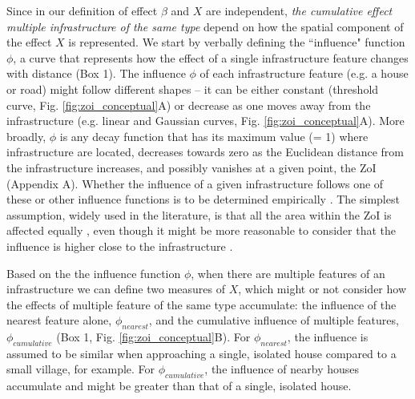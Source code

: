 \documentclass[titlepage]{article}
\begin{document}
{Since in our definition of effect $\beta$ and $X$ are independent, \textit{the cumulative effect multiple infrastructure of the same type} depend on how the spatial component of the effect $X$ is represented. We start by verbally defining the ``influence" function $\phi$, a curve that represents how the effect of a single infrastructure feature changes with distance (Box 1). The influence $\phi$ of each infrastructure feature (e.g. a house or road) might follow different shapes -- it can be either constant (threshold curve, Fig. \ref{fig:zoi_conceptual}A) or decrease as one moves away from the infrastructure (e.g. linear and Gaussian curves, Fig. \ref{fig:zoi_conceptual}A). More broadly, $\phi$ is any decay function that has its maximum value (= 1) where infrastructure are located, decreases towards zero as the Euclidean distance from the infrastructure increases, and possibly vanishes at a given point, the ZoI (Appendix A). Whether the influence of a given infrastructure follows one of these or other influence functions is to be determined empirically \citep{miguet_how_2017}. The simplest assumption, widely used in the literature, is that all the area within the ZoI is affected equally \citep[e.g][]{quinonezpinon_design_2007}, even though it might be more reasonable to consider that the influence is higher close to the infrastructure \citep[][]{skarin_out_2018, zeller_multi-level_2017}. 

Based on the the influence function $\phi$, when there are multiple features of an infrastructure we can define two measures of $X$, which might or not consider how the effects of multiple feature of the same type accumulate: the influence of the nearest feature alone, $\phi_{nearest}$, and the cumulative influence of multiple features, $\phi_{cumulative}$ (Box 1, Fig. \ref{fig:zoi_conceptual}B). For $\phi_{nearest}$, the influence is assumed to be similar when approaching a single, isolated house compared to a small village, for example. For $\phi_{cumulative}$, the influence of nearby houses accumulate and might be greater than that of a single, isolated house.

}
\end{document}
